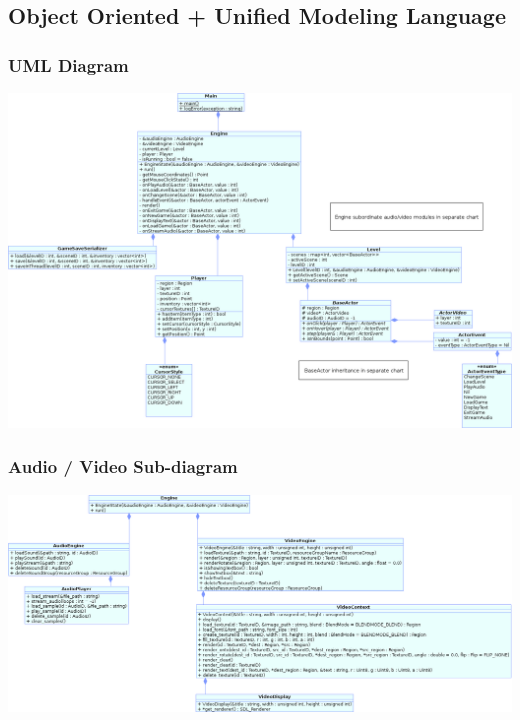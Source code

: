 \documentclass{article}
\begin{document}
	\subsection{Object Oriented + Unified Modeling Language}
		\subsubsection{UML Diagram}
			\begin{center}
				\includegraphics[scale=0.49,angle=90]{MainClasses.png}
			\end{center}
    \subsubsection{Audio / Video Sub-diagram}
      \begin{center}
				\includegraphics[scale=0.50,angle=90]{AudioVideoClasses.png}
      \end{center}
\end{document}
